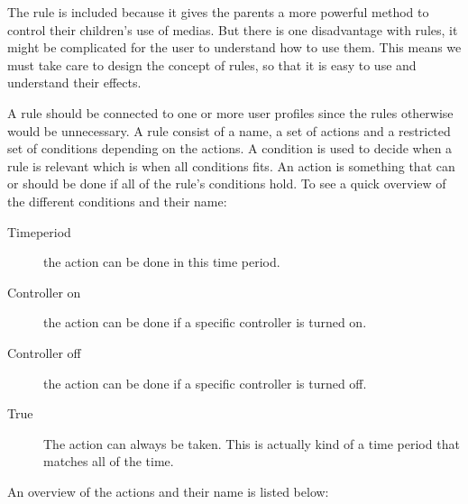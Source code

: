 The rule is included because it gives the parents a more powerful method to control their children's use of medias. 
But there is one disadvantage with rules, it might be complicated for the user to understand how to use them. 
This means we must take care to design the concept of rules, so that it is easy to use and understand their effects.

A rule should be connected to one or more user profiles since the rules otherwise would be unnecessary. A rule consist of a name, a set of actions and  a restricted set of conditions depending on the actions. A condition is used to decide when a rule is relevant which is when all conditions fits. An action is something that can or should be done if all of the rule's conditions hold.
To see a quick overview of the different conditions and their name:

\begin{description}
	\item[Timeperiod] the action can be done in this time period.%
	\item[Controller on] the action can be done if a specific controller is turned on. 
	\item[Controller off] the action can be done if a specific controller is turned off. 
	\item[True] The action can always be taken. This is actually kind of a time period that matches all of the time.
\end{description}

An overview of the actions and their name is listed below:

